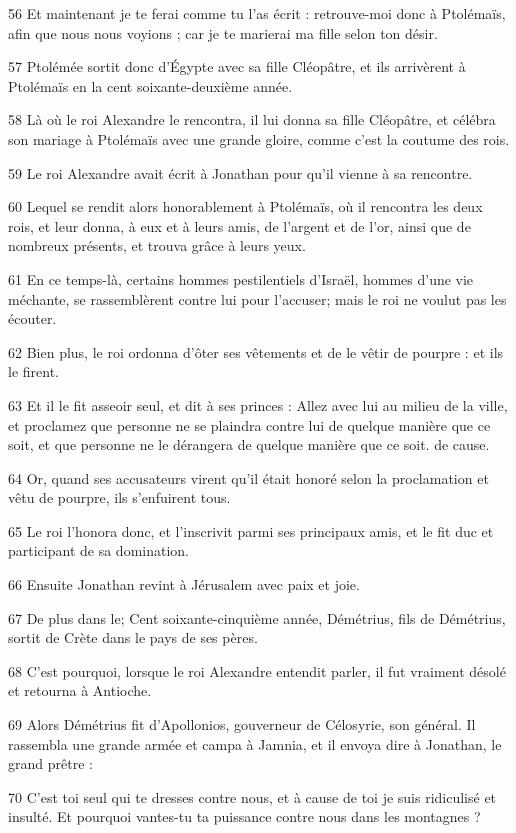 \par 56 Et maintenant je te ferai comme tu l'as écrit : retrouve-moi donc à Ptolémaïs, afin que nous nous voyions ; car je te marierai ma fille selon ton désir.
\par 57 Ptolémée sortit donc d'Égypte avec sa fille Cléopâtre, et ils arrivèrent à Ptolémaïs en la cent soixante-deuxième année.
\par 58 Là où le roi Alexandre le rencontra, il lui donna sa fille Cléopâtre, et célébra son mariage à Ptolémaïs avec une grande gloire, comme c'est la coutume des rois.
\par 59 Le roi Alexandre avait écrit à Jonathan pour qu'il vienne à sa rencontre.
\par 60 Lequel se rendit alors honorablement à Ptolémaïs, où il rencontra les deux rois, et leur donna, à eux et à leurs amis, de l'argent et de l'or, ainsi que de nombreux présents, et trouva grâce à leurs yeux.
\par 61 En ce temps-là, certains hommes pestilentiels d'Israël, hommes d'une vie méchante, se rassemblèrent contre lui pour l'accuser; mais le roi ne voulut pas les écouter.
\par 62 Bien plus, le roi ordonna d'ôter ses vêtements et de le vêtir de pourpre : et ils le firent.
\par 63 Et il le fit asseoir seul, et dit à ses princes : Allez avec lui au milieu de la ville, et proclamez que personne ne se plaindra contre lui de quelque manière que ce soit, et que personne ne le dérangera de quelque manière que ce soit. de cause.
\par 64 Or, quand ses accusateurs virent qu'il était honoré selon la proclamation et vêtu de pourpre, ils s'enfuirent tous.
\par 65 Le roi l'honora donc, et l'inscrivit parmi ses principaux amis, et le fit duc et participant de sa domination.
\par 66 Ensuite Jonathan revint à Jérusalem avec paix et joie.
\par 67 De plus dans le; Cent soixante-cinquième année, Démétrius, fils de Démétrius, sortit de Crète dans le pays de ses pères.
\par 68 C'est pourquoi, lorsque le roi Alexandre entendit parler, il fut vraiment désolé et retourna à Antioche.
\par 69 Alors Démétrius fit d'Apollonios, gouverneur de Célosyrie, son général. Il rassembla une grande armée et campa à Jamnia, et il envoya dire à Jonathan, le grand prêtre :
\par 70 C'est toi seul qui te dresses contre nous, et à cause de toi je suis ridiculisé et insulté. Et pourquoi vantes-tu ta puissance contre nous dans les montagnes ?
